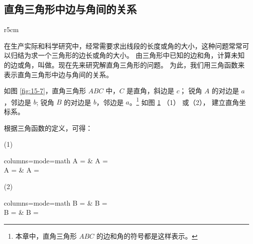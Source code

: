\subsection{直角三角形中边与角间的关系}\label{subsec:15-4}

\begin{wrapfigure}[7]{r}{5cm}
    \centering
    
    \caption{}\label{fig:15-7}
\end{wrapfigure}

在生产实际和科学研究中，经常需要求出线段的长度或角的大小，这种问题常常可以归结为求一个三角形的边长或角的大小。
由三角形中已知的边和角，计算未知的边或角，叫做。现在先来研究解直角三角形的问题。
为此，我们用三角函数来表示直角三角形中边与角间的关系。

如图 \ref{fig:15-7}，直角三角形 $ABC$ 中，$C$ 是直角，斜边是 $c$；
锐角 $A$ 的对边是 $a$，邻边是 $b$;
锐角 $B$ 的对边是 $b$，邻边是 $a$。\footnote{本章中，直角三角形 $ABC$ 的边和角的符号都是这样表示。}
如图 \ref{fig:15-8} （1） 或（2）， 建立直角坐标系。

\begin{figure}[htbp]
    \centering
    \begin{minipage}[b]{6cm}
        \centering
        
        \caption*{(1)}
    \end{minipage}
    \qquad
    \begin{minipage}[b]{6cm}
        \centering
        
        \caption*{(2)}
    \end{minipage}
    \caption{}\label{fig:15-8}
\end{figure}

根据三角函数的定义，可得：

(1) \begin{tblr}[t]{columns={mode=math}}
    \sin A =  \douhao & \cos A =  \douhao \\
    \tan A =  \douhao & \cot A =  \fenhao
\end{tblr}

(2) \begin{tblr}[t]{columns={mode=math}}
    \sin B =  \douhao & \cos B =  \douhao \\
    \tan B =  \douhao & \cot B =  \juhao
\end{tblr}


%     


